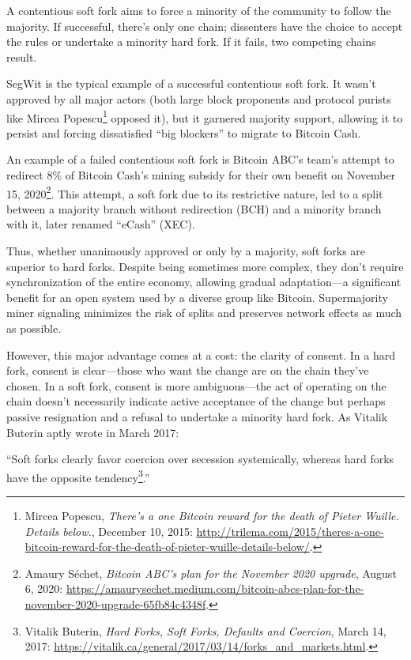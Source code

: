 \documentclass[
  a5paper,
  smalldemyvopaper,10pt,twoside,onecolumn,openright,extrafontsizes,hidelinks]{memoir}
\begin{document}
A contentious soft fork aims to force a minority of the community to
follow the majority. If successful, there's only one chain; dissenters
have the choice to accept the rules or undertake a minority hard fork.
If it fails, two competing chains result.

SegWit is the typical example of a successful contentious soft fork. It
wasn't approved by all major actors (both large block proponents and
protocol purists like Mircea Popescu\footnote{Mircea Popescu,
  \emph{There's a one Bitcoin reward for the death of Pieter Wuille.
  Details below.}, December 10, 2015:
  \url{http://trilema.com/2015/theres-a-one-bitcoin-reward-for-the-death-of-pieter-wuille-details-below/}.}
opposed it), but it garnered majority support, allowing it to persist
and forcing dissatisfied ``big blockers'' to migrate to Bitcoin Cash.

An example of a failed contentious soft fork is Bitcoin ABC's team's
attempt to redirect 8\% of Bitcoin Cash's mining subsidy for their own
benefit on November 15, 2020\footnote{Amaury Séchet, \emph{Bitcoin ABC's
  plan for the November 2020 upgrade}, August 6, 2020:
  \url{https://amaurysechet.medium.com/bitcoin-abcs-plan-for-the-november-2020-upgrade-65fb84c4348f}.}.
This attempt, a soft fork due to its restrictive nature, led to a split
between a majority branch without redirection (BCH) and a minority
branch with it, later renamed ``eCash'' (XEC).

Thus, whether unanimously approved or only by a majority, soft forks are
superior to hard forks. Despite being sometimes more complex, they don't
require synchronization of the entire economy, allowing gradual
adaptation---a significant benefit for an open system used by a diverse
group like Bitcoin. Supermajority miner signaling minimizes the risk of
splits and preserves network effects as much as possible.

However, this major advantage comes at a cost: the clarity of consent.
In a hard fork, consent is clear---those who want the change are on the
chain they've chosen. In a soft fork, consent is more ambiguous---the
act of operating on the chain doesn't necessarily indicate active
acceptance of the change but perhaps passive resignation and a refusal
to undertake a minority hard fork. As Vitalik Buterin aptly wrote in
March 2017:

``Soft forks clearly favor coercion over secession systemically, whereas
hard forks have the opposite tendency\footnote{Vitalik Buterin,
  \emph{Hard Forks, Soft Forks, Defaults and Coercion}, March 14, 2017:
  \url{https://vitalik.ca/general/2017/03/14/forks_and_markets.html}.}.''
\end{document}
